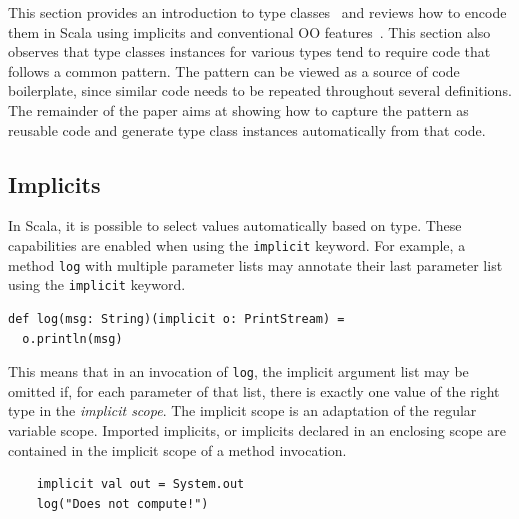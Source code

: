 \documentclass[preprint,nocopyrightspace]{sigplanconf}
\newcommand{\term}[1]{\mbox{\texttt{#1}}}
\begin{document}
This section provides an introduction to type classes~\cite{WadlerTypeClasses} and
reviews how to encode them in Scala using implicits and conventional
OO features~\cite{Oliveira2010}.  This section also observes that type
classes instances for various types tend to require code that follows
a common pattern. The pattern can be viewed as a source of code
boilerplate, since similar code needs to be repeated throughout several
definitions. The remainder of the paper aims at showing how
to capture the pattern as reusable code and generate type class
instances automatically from that code.


%
%

\subsection{Implicits}
\label{sec:implicits}

In Scala, it is possible to select values
automatically based on type. These capabilities are enabled when using the
\term{implicit} keyword. For example, a method \term{log} with multiple
parameter lists may annotate their last parameter list using the
\term{implicit} keyword.%

\begin{lstlisting}
def log(msg: String)(implicit o: PrintStream) =
  o.println(msg)
\end{lstlisting}

This means that in an invocation of \term{log}, the implicit argument list may
be omitted if, for each parameter of that list, there is exactly one value of
the right type in the {\em implicit scope}. The implicit scope is an
adaptation of the regular variable scope. Imported implicits, or implicits
declared in an enclosing scope are contained in the implicit scope of a method
invocation. 

\begin{lstlisting}
    implicit val out = System.out
    log("Does not compute!")
\end{lstlisting}
\end{document}
